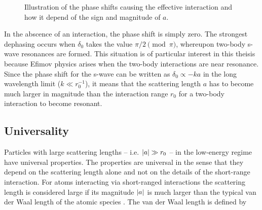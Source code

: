 \begin{figure}
	\centering  
	\caption{Illustration of the phase shifts causing the effective interaction and how it depend of the sign and magnitude of $a$.}\label{fig:phaseshift}
\end{figure}
In the abscence of an interaction, the phase shift is simply zero. The strongest dephasing occurs when $\delta_0$ takes the value $\pi/2 \pmod{\pi}$, whereupon two-body s-wave resonances are formed. This situation is of particular interest in this theisis because Efimov physics arises when the two-body interactions are near resonance. Since the phase shift for the s-wave can be written as $\delta_0 \propto -ka$ in the long wavelength limit ($k \ll r_0^{-1}$), it means that the scattering length $a$ has to become much larger in magnitude than the interaction range $r_0$ for a two-body interaction to become resonant.

\subsection{Universality}
Particles with large scattering lengths -- i.e. $\lvert a\rvert\gg r_0$ -- in the low-energy regime have universal properties. The properties are universal in the sense that they depend on the scattering length alone and not on the details of the short-range interaction. For atoms interacting via short-ranged interactions the scattering length is considered large if its magnitude $\lvert a\rvert$ is much larger than the typical van der Waal length of the atomic species \cite{2008AnPhy.323.1770B}. The van der Waal length is defined by

